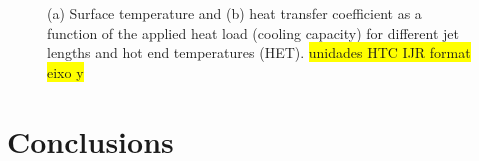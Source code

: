 \documentclass[review,preprint,12pt]{elsarticle}
\begin{document}
\begin{figure}[!htp]
\centering
{}
\hfil
{}
\caption{(a) Surface temperature and (b) heat transfer coefficient as a function of the applied heat load (cooling capacity) for different jet lengths and hot end temperatures (HET). \colorbox{yellow}{unidades HTC IJR format eixo y}}
\label{fig:Figure_14}
\end{figure}

\section{Conclusions}
\end{document}
